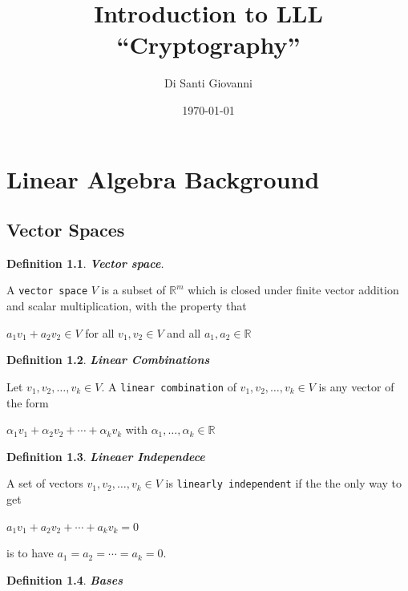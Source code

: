 \documentclass[a4paper,12pt]{report}
\title{Introduction to LLL\\``Cryptography''}
\author{Di Santi Giovanni}
\date{\today}
\newtheorem{definition}{Definition}[section]
\newcommand{\R}{\mathbb{R}}
\begin{document}
 
\maketitle

\tableofcontents

\chapter{Linear Algebra Background}

\section{Vector Spaces}

\begin{definition}
    \textbf{Vector space}.
\end{definition}
A \texttt{vector space} $V$ is a subset of $\R^{m}$ which is closed under finite vector addition and scalar multiplication, with the property that

\begin{center}
   $a_1v_1 + a_2v_2 \in V$ for all $v_1,v_2 \in V$ and all $a_1,a_2 \in \R$
\end{center}

\begin{definition}
    \textbf{Linear Combinations}
\end{definition}

Let $v_1,v_2,\ldots,v_k \in V$. A \texttt{linear combination} of $v_1,v_2,\ldots,v_k \in V$ is any vector of the form

\begin{center}
    $\alpha_1v_1 + \alpha_2v_2 + \cdots + \alpha_kv_k$ with $\alpha_1, \ldots, \alpha_k \in \R$
\end{center}

\begin{definition}
    \textbf{Lineaer Independece}
\end{definition}

A set of vectors $v_1,v_2,\ldots,v_k \in V$ is \texttt{linearly independent} if the the only way to get

\begin{center}
    $a_1v_1 + a_2v_2 + \cdots + a_kv_k = 0$
\end{center}

is to have $a_1 = a_2 = \cdots = a_k = 0$.

\begin{definition}
    \textbf{Bases}
\end{definition}
\end{document}
